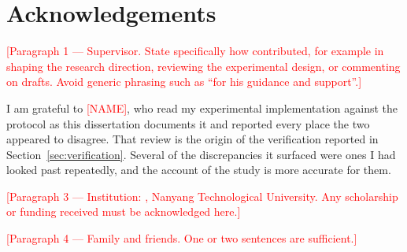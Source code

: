 \chapter*{Acknowledgements}

%

\textcolor{red}{[Paragraph 1 --- Supervisor. State specifically how \SupervisorName{} contributed, for example in shaping the research direction, reviewing the experimental design, or commenting on drafts. Avoid generic phrasing such as ``for his guidance and support''.]}

\vspace{0.5\baselineskip}

I am grateful to \textcolor{red}{[NAME]}, who read my experimental implementation against the protocol as this dissertation documents it and reported every place the two appeared to disagree. That review is the origin of the verification reported in Section~\ref{sec:verification}. Several of the discrepancies it surfaced were ones I had looked past repeatedly, and the account of the study is more accurate for them.

\vspace{0.5\baselineskip}

\textcolor{red}{[Paragraph 3 --- Institution: \SchoolName{}, Nanyang Technological University. Any scholarship or funding received must be acknowledged here.]}

\vspace{0.5\baselineskip}

\textcolor{red}{[Paragraph 4 --- Family and friends. One or two sentences are sufficient.]}
